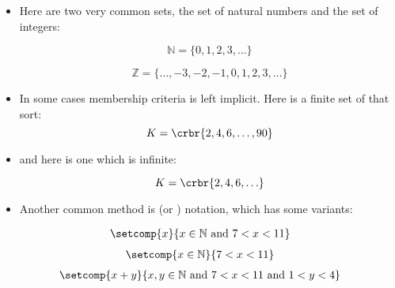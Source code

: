 \documentclass[11pt]{article}
\begin{document}
\begin{itemize}
\item[]Here are two very common  sets, the set of natural numbers and the set of integers:


\[
\mathbb{N} = \{0,1,2,3,\ldots\}
\]

\[
\mathbb{Z} = \{\ldots,-3,-2,-1,0,1,2,3,\ldots\}
\]

\item In some cases membership criteria is left implicit. 
Here is a finite set of that sort:
\[
K = \crbr{2,4,6,\ldots,90}
\]

\item[]and here is one which is infinite:

\[
K = \crbr{2,4,6,\ldots}
\]

\end{itemize}


\begin{itemize}
\item Another common method is  (or ) notation, which has
some variants:
\end{itemize}


\begin{align}
\setcomp{x}{x \in \mathbb{N} \text{ and }7 < x < 11}
\end{align}
\begin{align}
\setcomp{x \in \mathbb{N}}{7 < x < 11}
\end{align}
\begin{align}
\setcomp{x + y}{x, y \in \mathbb{N}\text{ and }7 < x < 11\text{ and }1 < y < 4}
\end{align}
\end{document}
